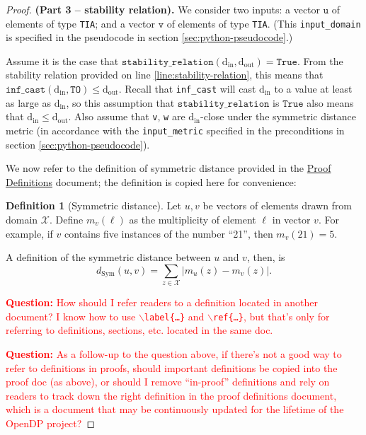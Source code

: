 \documentclass[12pt,letterpaper]{article}
\newcommand{\din}{\mathrm{d_{in}}}
\newcommand{\dout}{\mathrm{d_{out}}}
\newcommand{\question}[1]{\textcolor{red}{\textbf{Question:} #1}}
\newcommand{\True}{\texttt{True}}
\theoremstyle{definition}
\newtheorem{definition}{Definition}[section]
\begin{document}
\begin{proof} \textbf{(Part 3 -- stability relation).} We consider two inputs: a vector $\texttt{u}$ of elements of type \texttt{TIA}; and a vector $\texttt{v}$ of elements of type \texttt{TIA}. (This \texttt{input\_domain} is specified in the pseudocode in section \ref{sec:python-pseudocode}.)

Assume it is the case that $\texttt{stability\_relation}(\din, \dout) = \True$. From  the stability relation provided on line \ref{line:stability-relation}, this means that $\texttt{inf\_cast}(\din, \texttt{TO}) \leq \dout$. Recall that \texttt{inf\_cast} will cast $\din$ to a value at least as large as $\din$, so this assumption that $\texttt{stability\_relation}$ is $\True$ also means that $\din \leq \dout$. Also assume that \texttt{v}, \texttt{w} are $\din$-close under the symmetric distance metric (in accordance with the \texttt{input\_metric} specified in the preconditions in section \ref{sec:python-pseudocode}).

We now refer to the definition of symmetric distance provided in the \href{https://www.overleaf.com/project/60d214e390b337703d200982}{Proof Definitions} document; the definition is copied here for convenience:

\begin{definition}[Symmetric distance]
\label{defn:symm-dist}
Let $u,v$ be vectors of elements drawn from domain $\mathcal{X}$. Define $m_v(\ell)$ as the multiplicity of element $\ell$ in vector $v$. For example, if $v$ contains five instances of the number ``21'', then $m_v(21) = 5$.

A definition of the symmetric distance between $u$ and $v$, then, is $$d_{\text{Sym}}(u,v) = \sum_{z\in \mathcal{X}} |m_u(z) - m_v(z)|.$$
\end{definition}

\question{How should I refer readers to a definition located in another document? I know how to use \texttt{$\backslash$label\{\ldots\}} and \texttt{$\backslash$ref\{\ldots\}}, but that's only for referring to definitions, sections, etc. located in the same doc.}

\question{As a follow-up to the question above, if there's not a good way to refer to definitions in proofs, should important definitions be copied into the proof doc (as above), or should I remove ``in-proof'' definitions and rely on readers to track down the right definition in the proof definitions document, which is a document that may be continuously updated for the lifetime of the OpenDP project?}


\end{proof}
\end{document}
